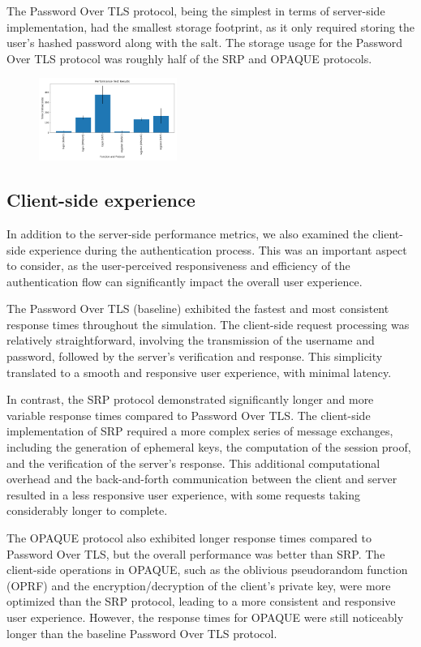The Password Over TLS protocol, being the simplest in terms of server-side implementation, had the smallest storage footprint, as it only required storing the user's hashed password along with the salt. The storage usage for the Password Over TLS protocol was roughly half of the SRP and OPAQUE protocols.

\begin{figure}[ht]
  \centering
  \includegraphics[width=0.4\textwidth]{./images/performance_test.png}
  \label{fig:performance_test}
\end{figure}

\subsection{Client-side experience}

In addition to the server-side performance metrics, we also examined the client-side experience during the authentication process. This was an important aspect to consider, as the user-perceived responsiveness and efficiency of the authentication flow can significantly impact the overall user experience.

The Password Over TLS (baseline) exhibited the fastest and most consistent response times throughout the simulation. The client-side request processing was relatively straightforward, involving the transmission of the username and password, followed by the server's verification and response. This simplicity translated to a smooth and responsive user experience, with minimal latency.

In contrast, the SRP protocol demonstrated significantly longer and more variable response times compared to Password Over TLS. The client-side implementation of SRP required a more complex series of message exchanges, including the generation of ephemeral keys, the computation of the session proof, and the verification of the server's response. This additional computational overhead and the back-and-forth communication between the client and server resulted in a less responsive user experience, with some requests taking considerably longer to complete.

The OPAQUE protocol also exhibited longer response times compared to Password Over TLS, but the overall performance was better than SRP. The client-side operations in OPAQUE, such as the oblivious pseudorandom function (OPRF) and the encryption/decryption of the client's private key, were more optimized than the SRP protocol, leading to a more consistent and responsive user experience. However, the response times for OPAQUE were still noticeably longer than the baseline Password Over TLS protocol.